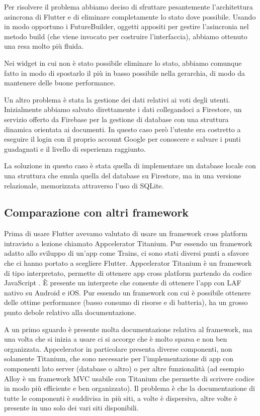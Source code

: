 Per risolvere il problema abbiamo deciso di sfruttare pesantemente l'architettura asincrona di Flutter e di eliminare completamente lo stato dove possibile.
Usando in modo opportuno i FutureBuilder, oggetti appositi per gestire l'asincronia nel metodo build (che viene invocato per costruire l'interfaccia), abbiamo ottenuto una resa molto più fluida.

Nei widget in cui non è stato possibile eliminare lo stato, abbiamo comunque fatto in modo di spostarlo il più in basso possibile nella gerarchia, di modo da mantenere delle buone performance.

Un altro problema è stata la gestione dei dati relativi ai voti degli utenti.
Inizialmente abbiamo salvato direttamente i dati collegandoci a Firestore, un servizio offerto da Firebase per la gestione di database con una struttura dinamica orientata ai documenti.
In questo caso però l'utente era costretto a eseguire il login con il proprio account Google per conoscere e salvare i punti guadagnati e il livello di esperienza raggiunto.

La soluzione in questo caso è stata quella di implementare un database locale con una struttura che emula quella del database su Firestore, ma in una versione relazionale, memorizzata attraverso l'uso di SQLite.

\subsection{Comparazione con altri framework\label{sec:flutter-comparazione}}

Prima di usare Flutter avevamo valutato di usare un framework cross platform intravisto a lezione chiamato Appcelerator Titanium.
Pur essendo un framework adatto allo sviluppo di un'app come Trains, ci sono stati diversi punti a sfavore che ci hanno portato a scegliere Flutter.
Appcelerator Titanium è un framework di tipo interpretato, permette di ottenere app cross platform partendo da codice JavaScript \parencite{gaggi:framework}.
È presente un interprete che consente di ottenere l'app con LAF nativo su Android e iOS.
Pur essendo un framework con cui è possibile ottenere delle ottime performance (basso consumo di risorse e di batteria), ha un grosso punto debole relativo alla documentazione.

A un primo sguardo è presente molta documentazione relativa al framework, ma una volta che si inizia a usare ci si accorge che è molto sparsa e non ben organizzata.
Appcelerator in particolare presenta diverse componenti, non solamente Titanium, che sono necessarie per l'implementazione di app con componenti lato server (database o altro) o per altre funzionalità (ad esempio Alloy è un framework MVC usabile con Titanium che permette di scrivere codice in modo più efficiente e ben organizzato).
Il problema è che la documentazione di tutte le componenti è suddivisa in più siti, a volte è dispersiva, altre volte è presente in uno solo dei vari siti disponibili.

